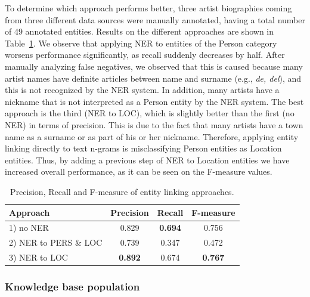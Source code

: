 To determine which approach performs better, three artist biographies coming from three different data sources were manually annotated, having a total number of 49 annotated entities. %
Results on the different approaches are shown in Table~\ref{tbl:musicology:res1}. We observe that applying NER to entities of the Person category worsens performance significantly, as recall suddenly decreases by half. After manually analyzing false negatives, we observed that this is caused because many artist names have definite articles between name and surname (e.g., \textit{de, del}), and this is not recognized by the NER system. In addition, many artists have a nickname that is not interpreted as a Person entity by the NER system. The best approach is the third (NER to LOC), which is slightly better than the first (no NER) in terms of precision. This is due to the fact that many artists have a town name as a surname or as part of his or her nickname. Therefore, applying entity linking directly to text n-grams is misclassifying Person entities as Location entities. Thus, by adding a previous step of NER to Location entities we have increased overall performance, as it can be seen on the F-measure values.

\begin{table}
	\centering
	  \begin{tabular}{  l c c c }
    \hline
    Approach & Precision & Recall & F-measure \\ 
    \hline
    1) no NER & 0.829 & \textbf{0.694} & 0.756 \\ 
    2) NER to PERS \& LOC & 0.739 & 0.347 & 0.472 \\
    3) NER to LOC & \textbf{0.892} & 0.674 & \textbf{0.767} \\
    \hline
  \end{tabular}
	\caption{Precision, Recall and F-measure of entity linking approaches.}
	
	\label{tbl:musicology:res1}
\end{table}

\subsubsection{Knowledge base population}
\label{sec:musicology:ie}

